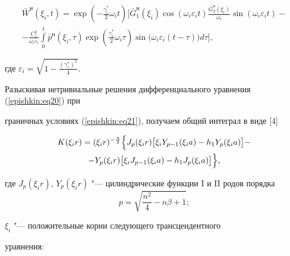 \begin{multline}

\label{epishkin:eq25}

 \bar  W ^{\text{н}}(\xi _i , t)=

 \exp  \left(-\frac{\gamma _i^\ast }{2}  \omega _i   t \right)  

 \Biggl[ \bar  G _1^{\text{н}} (\xi_i)  \cos  (\omega _i   \varepsilon _i   t) \frac{\bar  G _2^{\text{н}} (\xi _i )}{\omega _i }  

 \sin (\omega _i   \varepsilon _i   t)- \\ 

-\frac{C_1^2 }{\omega _i   \varepsilon _i }

\int\limits_0^t 

\bar  p^{\text{н}} ( \xi _i ,\tau )  

\exp  \left(\frac{\gamma _i^\ast }{2}  \omega _i   \tau  \right)  

\sin \bigl(\omega _i   \varepsilon _i   (t-\tau )\bigr)d\tau

\Biggr], 

\end{multline}

где $ \varepsilon _i =\sqrt {1-\frac{\left( {\gamma _i^\ast } 

\right)^2}{4}} .$



Разыскивая нетривиальные решения дифференциального уравнения (\ref{epishkin:eq20}) при 

граничных условиях (\ref{epishkin:eq21}), получаем общий интеграл в виде [4]

\begin{multline}

\label{epishkin:eq26}

K(\xi_i r)=(\xi _i r)^{-\frac{n}{2}}  \Bigl\{

J_p (\xi_i r) \bigl[ \xi _i Y_{p-1} (\xi _i a)-h_1 Y_p (\xi _i a) \bigr]-\\ -Y_p (\xi _i r)\bigl[ \xi _i J_{p-1} (\xi _i a)-h_1 J_p (\xi 

_i a)  \bigr] \Bigr\},

\end{multline}

где $J_p (\xi_i r)$, $Y_p (\xi_i r)$ "--- цилиндрические функции I и II родов порядка $$p=\sqrt {\frac{n^2}{4}-n\beta +1};$$

$\xi_i$ "--- положительные корни следующего трансцендентного 

уравнения:

